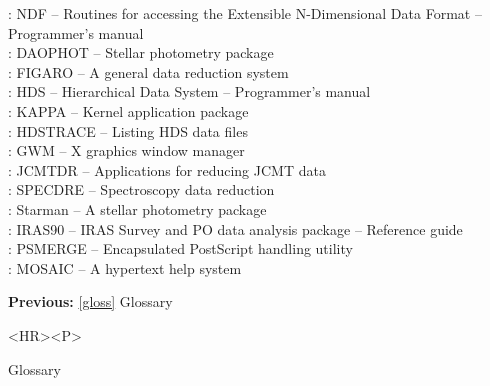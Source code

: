 : NDF -- Routines for
   accessing the Extensible N-Dimensional Data Format -- Programmer's
   manual\\
: DAOPHOT -- Stellar
   photometry package\\
: FIGARO -- A general data
   reduction system\\
: HDS -- Hierarchical Data
   System -- Programmer's manual\\
: KAPPA -- Kernel application
   package\\
: HDSTRACE -- Listing HDS
   data files\\
: GWM -- X graphics window
   manager\\
: JCMTDR -- Applications
   for reducing JCMT data\\
: SPECDRE -- Spectroscopy
   data reduction\\
: Starman -- A stellar
   photometry package\\
: IRAS90 -- IRAS Survey and
   PO data analysis package -- Reference guide\\
: PSMERGE -- Encapsulated
   PostScript handling utility\\
: MOSAIC -- A hypertext
   help system\\

\begin{latexonly}
{\bf Previous:} \ref{gloss} Glossary\\
\end{latexonly}

\begin{htmlonly}
\begin{rawhtml} <HR><P> \end{rawhtml}
{\bf {}} Glossary\\
{\bf {}}\\
{\bf {}}\\
\end{htmlonly}


